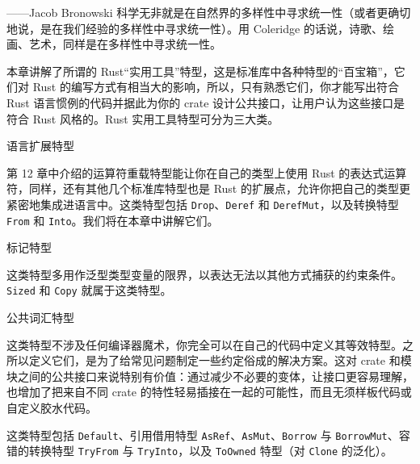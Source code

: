 
\begin{myEpigraph}{——Jacob Bronowski}
科学无非就是在自然界的多样性中寻求统一性（或者更确切地说，是在我们经验的多样性中寻求统一性）。用 Coleridge 的话说，诗歌、绘画、艺术，同样是在多样性中寻求统一性。
\end{myEpigraph}

本章讲解了所谓的 Rust“实用工具”特型，这是标准库中各种特型的“百宝箱”，它们对 Rust 的编写方式有相当大的影响，所以，只有熟悉它们，你才能写出符合 Rust 语言惯例的代码并据此为你的 crate 设计公共接口，让用户认为这些接口是符合 Rust 风格的。Rust 实用工具特型可分为三大类。

\begin{mySidenote}
语言扩展特型
\end{mySidenote}

第 12 章中介绍的运算符重载特型能让你在自己的类型上使用 Rust 的表达式运算符，同样，还有其他几个标准库特型也是 Rust 的扩展点，允许你把自己的类型更紧密地集成进语言中。这类特型包括 \texttt{Drop}、\texttt{Deref} 和 \texttt{DerefMut}，以及转换特型 \texttt{From} 和 \texttt{Into}。我们将在本章中讲解它们。

\begin{mySidenote}
标记特型
\end{mySidenote}

这类特型多用作泛型类型变量的限界，以表达无法以其他方式捕获的约束条件。\texttt{Sized} 和 \texttt{Copy} 就属于这类特型。

\begin{mySidenote}
公共词汇特型
\end{mySidenote}

这类特型不涉及任何编译器魔术，你完全可以在自己的代码中定义其等效特型。之所以定义它们，是为了给常见问题制定一些约定俗成的解决方案。这对 crate 和模块之间的公共接口来说特别有价值：通过减少不必要的变体，让接口更容易理解，也增加了把来自不同 crate 的特性轻易插接在一起的可能性，而且无须样板代码或自定义胶水代码。

这类特型包括 \texttt{Default}、引用借用特型 \texttt{AsRef}、\texttt{AsMut}、\texttt{Borrow} 与 \texttt{BorrowMut}、容错的转换特型 \texttt{TryFrom} 与 \texttt{TryInto}，以及 \texttt{ToOwned} 特型（对 \texttt{Clone} 的泛化）。

